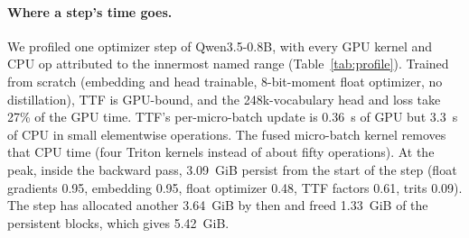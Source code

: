 \documentclass[10pt,twocolumn]{article}
\begin{document}
\begin{table}[t]
\centering
\caption{One optimizer step of Qwen3.5-0.8B, profiled (16 micro-batches of 2048 tokens, RTX 4070 with a Ryzen 3950X,
before the speed changes listed in the text). Seconds per step; peak allocated memory in GiB. The conversion runs
distil from the full-precision teacher with the head frozen; the bf16 AdamW reference uses cross-entropy only.}
\label{tab:profile}
\end{table}

\paragraph{Where a step's time goes.} We profiled one optimizer step of Qwen3.5-0.8B, with every GPU kernel and CPU op
attributed to the innermost named range (Table~\ref{tab:profile}). Trained from scratch (embedding and head trainable,
8-bit-moment float optimizer, no distillation), TTF is GPU-bound, and the 248k-vocabulary head and loss take 27\% of the
GPU time. TTF's per-micro-batch update is 0.36~s of GPU but 3.3~s of CPU in small elementwise operations. The fused
micro-batch kernel removes that CPU time (four Triton kernels instead of about fifty operations). At the peak, inside
the backward pass, 3.09~GiB persist from the start of the step (float gradients 0.95, embedding 0.95, float optimizer
0.48, TTF factors 0.61, trits 0.09). The step has allocated another 3.64~GiB by then and freed 1.33~GiB of the
persistent blocks, which gives 5.42~GiB.
\end{document}
